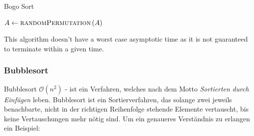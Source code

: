 \documentclass[a4paper]{article}
\begin{document}
\begin{algorithm}
    \caption{Bogo Sort}
    \label{alg:BogoSort}
    \begin{algorithmic}
        \State $A \gets \textsc{randomPermutation}\left(A\right)$
        \EndWhile
    \end{algorithmic}
\end{algorithm}
This algorithm doesn't have a worst case asymptotic time as it is not guaranteed to terminate within a given time. 



    \subsubsection{Bubblesort}\label{Bubblesort}
    Bubblesort $\mathcal{O}(n^2)$ - ist ein Verfahren, welches nach dem Motto \textit{Sortierten durch Einfügen} leben. Bubblesort ist ein Sortierverfahren, das solange zwei jeweils
    benachbarte, nicht in der richtigen Reihenfolge stehende Elemente vertauscht, bis keine Vertauschungen mehr nötig sind.
    Um ein genaueres Verständnis zu erlangen ein Beispiel: \\
    
\end{document}
